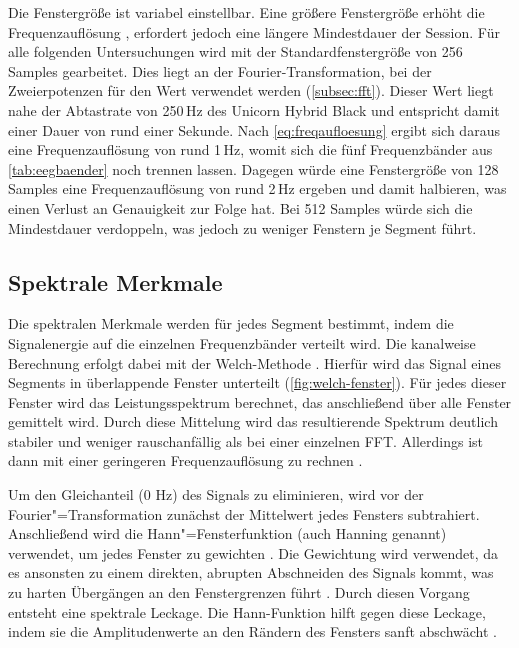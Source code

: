 \noindent Die Fenstergröße ist variabel einstellbar. Eine größere Fenstergröße erhöht die Frequenzauflösung \autocite{windowing_welch2021}, erfordert jedoch eine längere Mindestdauer der Session. Für alle folgenden Untersuchungen wird mit der Standardfenstergröße von 256 Samples gearbeitet. Dies liegt an der Fourier-Transformation, bei der Zweierpotenzen für den Wert verwendet werden (\autoref{subsec:fft}). Dieser Wert liegt nahe der Abtastrate von 250\,Hz des Unicorn Hybrid Black und entspricht damit einer Dauer von rund einer Sekunde. Nach \autoref{eq:freqaufloesung} ergibt sich daraus eine Frequenzauflösung von rund 1\,Hz, womit sich die fünf Frequenzbänder aus \autoref{tab:eegbaender} noch trennen lassen. Dagegen würde eine Fenstergröße von 128 Samples eine Frequenzauflösung von rund 2\,Hz ergeben und damit halbieren, was einen Verlust an Genauigkeit zur Folge hat. Bei 512 Samples würde sich die Mindestdauer verdoppeln, was jedoch zu weniger Fenstern je Segment führt.

\subsection{Spektrale Merkmale}
\label{subsec:spektral}
Die spektralen Merkmale werden für jedes Segment bestimmt, indem die Signalenergie auf die einzelnen Frequenzbänder verteilt wird.
Die kanalweise Berechnung erfolgt dabei mit der Welch-Methode \autocite{windowing_welch2021}. Hierfür wird das Signal eines Segments in überlappende Fenster unterteilt (\autoref{fig:welch-fenster}).
Für jedes dieser Fenster wird das Leistungsspektrum berechnet, das anschließend über alle Fenster gemittelt wird. Durch diese Mittelung wird das resultierende Spektrum deutlich stabiler und weniger rauschanfällig als bei einer einzelnen \ac{FFT}. Allerdings ist dann mit einer geringeren Frequenzauflösung zu rechnen \autocite{windowing_welch2021}.
\vspace{\baselineskip}

\noindent Um den Gleichanteil (0 Hz) des Signals zu eliminieren, wird vor der Fourier"=Transformation zunächst der Mittelwert jedes Fensters subtrahiert. Anschließend wird die Hann"=Fensterfunktion (auch Hanning genannt) verwendet, um jedes Fenster zu gewichten \autocite{windowing_welch2021}. Die Gewichtung wird verwendet, da es ansonsten zu einem direkten, abrupten Abschneiden des Signals kommt, was zu harten Übergängen an den Fenstergrenzen führt \autocite{windowing_welch2021}. Durch diesen Vorgang entsteht eine spektrale Leckage. Die Hann-Funktion hilft gegen diese Leckage, indem sie die Amplitudenwerte an den Rändern des Fensters sanft abschwächt \autocite{windowing_welch2021}. 
\vspace{\baselineskip}


